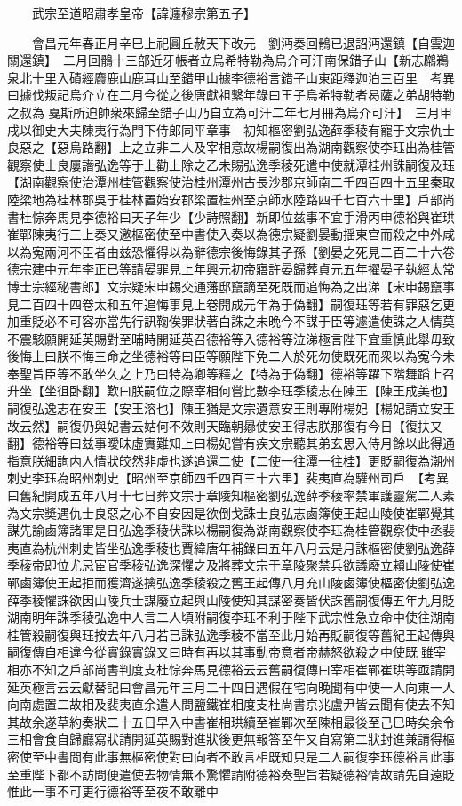 　　武宗至道昭肅孝皇帝【諱瀍穆宗第五子】

　　會昌元年春正月辛巳上祀圓丘赦天下改元　劉沔奏回鶻已退詔沔還鎮【自雲迦關還鎮】　二月回鶻十三部近牙帳者立烏希特勒為烏介可汗南保錯子山【新志鸊鵜泉北十里入磧經麚鹿山鹿耳山至錯甲山據李德裕言錯子山東距釋迦泊三百里　考異曰據伐叛記烏介立在二月今從之後唐獻祖繋年錄曰王子烏希特勒者曷薩之弟胡特勒之叔為戛斯所迫帥衆來歸至錯子山乃自立為可汗二年七月冊為烏介可汗】　三月甲戌以御史大夫陳夷行為門下侍郎同平章事　初知樞密劉弘逸薛季稜有寵于文宗仇士良惡之【惡烏路翻】上之立非二人及宰相意故楊嗣復出為湖南觀察使李珏出為桂管觀察使士良屢譖弘逸等于上勸上除之乙未賜弘逸季稜死遣中使就潭桂州誅嗣復及珏【湖南觀察使治潭州桂管觀察使治桂州潭州古長沙郡京師南二千四百四十五里秦取陸梁地為桂林郡吳于桂林置始安郡梁置桂州至京師水陸路四千七百六十里】戶部尚書杜悰奔馬見李德裕曰天子年少【少詩照翻】新即位兹事不宜手滑丙申德裕與崔珙崔鄲陳夷行三上奏又邀樞密使至中書使入奏以為德宗疑劉晏動揺東宫而殺之中外咸以為寃兩河不臣者由兹恐懼得以為辭德宗後悔錄其子孫【劉晏之死見二百二十六卷德宗建中元年李正已等請晏罪見上年興元初帝寤許晏歸葬貞元五年擢晏子執經太常博士宗經秘書郎】文宗疑宋申錫交通藩邸竄謫至死既而追悔為之出涕【宋申錫竄事見二百四十四卷太和五年追悔事見上卷開成元年為于偽翻】嗣復珏等若有罪惡乞更加重貶必不可容亦當先行訊鞠俟罪狀著白誅之未晩今不謀于臣等遽遣使誅之人情莫不震駭願開延英賜對至晡時開延英召德裕等入德裕等泣涕極言陛下宜重慎此舉毋致後悔上曰朕不悔三命之坐德裕等曰臣等願陛下免二人於死勿使既死而衆以為寃今未奉聖旨臣等不敢坐久之上乃曰特為卿等釋之【特為于偽翻】德裕等躍下階舞蹈上召升坐【坐徂卧翻】歎曰朕嗣位之際宰相何嘗比數李珏季稜志在陳王【陳王成美也】嗣復弘逸志在安王【安王溶也】陳王猶是文宗遺意安王則專附楊妃【楊妃請立安王故云然】嗣復仍與妃書云姑何不效則天臨朝曏使安王得志朕那復有今日【復扶又翻】德裕等曰兹事曖昧虛實難知上曰楊妃嘗有疾文宗聽其弟玄思入侍月餘以此得通指意朕細詢内人情狀皎然非虛也遂追還二使【二使一往潭一往桂】更貶嗣復為潮州刺史李珏為昭州刺史【昭州至京師四千四百三十六里】裴夷直為驩州司戶　【考異曰舊紀開成五年八月十七日葬文宗于章陵知樞密劉弘逸薛季稜率禁軍護靈駕二人素為文宗奬遇仇士良惡之心不自安因是欲倒戈誅士良弘志鹵簿使王起山陵使崔鄲覺其謀先諭鹵簿諸軍是日弘逸季稜伏誅以楊嗣復為湖南觀察使李珏為桂管觀察使中丞裴夷直為杭州刺史皆坐弘逸季稜也賈緯唐年補錄曰五年八月云是月誅樞密使劉弘逸薛季稜帝即位尤忌宦官季稜弘逸深懼之及將葬文宗于章陵聚禁兵欲議廢立賴山陵使崔鄲鹵簿使王起拒而獲濟遂擒弘逸季稜殺之舊王起傳八月充山陵鹵簿使樞密使劉弘逸薛季稜懼誅欲因山陵兵士謀廢立起與山陵使知其謀密奏皆伏誅舊嗣復傳五年九月貶湖南明年誅季稜弘逸中人言二人頃附嗣復李珏不利于陛下武宗性急立命中使往湖南桂管殺嗣復與珏按去年八月若已誅弘逸季稜不當至此月始再貶嗣復等舊紀王起傳與嗣復傳自相違今從實錄實錄又曰時有再以其事動帝意者帝赫怒欲殺之中使既雖宰相亦不知之戶部尚書判度支杜悰奔馬見德裕云云舊嗣復傳曰宰相崔鄲崔珙等亟請開延英極言云云獻替記曰會昌元年三月二十四日遇假在宅向晚聞有中使一人向東一人向南處置二故相及裴夷直余遣人問鹽鐵崔相度支杜尚書京兆盧尹皆云聞有使去不知其故余遂草約奏狀二十五日早入中書崔相珙續至崔鄲次至陳相最後至己巳時矣余令三相會食自歸廳寫狀請開延英賜對進狀後更無報答至午又自寫第二狀封進兼請得樞密使至中書問有此事無樞密使對曰向者不敢言相既知只是二人嗣復李珏德裕言此事至重陛下都不訪問便遣使去物情無不驚懼請附德裕奏聖旨若疑德裕情故請先自遠貶惟此一事不可更行德裕等至夜不敢離中